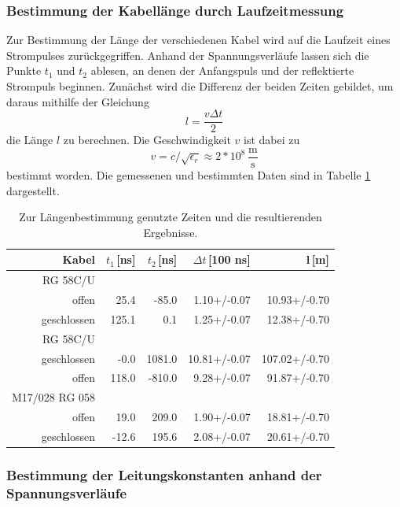 \subsubsection{Bestimmung der Kabellänge durch Laufzeitmessung} %
\label{sub:bestimmung_der_kabellaenge_durch_laufzeitmessung}

Zur Bestimmung der Länge der verschiedenen Kabel wird auf die Laufzeit eines Strompulses zurückgegriffen.
Anhand der Spannungsverläufe lassen sich die Punkte $t_1$ und $t_2$ ablesen, an denen der Anfangspuls und der reflektierte Strompuls beginnen.
Zunächst wird die Differenz der beiden Zeiten gebildet, um daraus mithilfe der Gleichung
\begin{equation}
	l = \frac{v \Delta t}{2}
\end{equation}
die Länge $l$ zu berechnen.
Die Geschwindigkeit $v$ ist dabei zu
\begin{equation}
	v = c/\sqrt{\epsilon_r} \approx 2*10^{8}\,\frac{\text{m}}{\text{s}}
\end{equation}
bestimmt worden.
Die gemessenen und bestimmten Daten sind in Tabelle \ref{tab_zeit1} dargestellt.


\begin{table}
\centering
	\caption[]{Zur Längenbestimmung genutzte Zeiten und die resultierenden Ergebnisse.}
	\begin{tabular}{r r r r r}
		Kabel & $t_1$\,[ns] & $t_2$\,[ns] & $\Delta t$\,[100 ns] & l\,[m]\\
		\hline \hline
		 RG 58C/U & & & & \\
		 offen & 	  25.4	&   -85.0	&	 1.10+/-0.07 &	 10.93+/-0.70\\
		geschlossen	& 125.1	&     0.1	&	 1.25+/-0.07 &	 12.38+/-0.70\\
		RG 58C/U & &&&\\
		geschlossen	&  -0.0	&  1081.0	&	10.81+/-0.07 &	107.02+/-0.70\\
		offen	 & 118.0	&  -810.0	&	 9.28+/-0.07 &	 91.87+/-0.70\\
		M17/028 RG 058&&&&\\
		offen 	 & 19.0	&   209.0	&	 1.90+/-0.07 &	 18.81+/-0.70\\
		geschlossen	 & -12.6	&   195.6	&	 2.08+/-0.07 &	 20.61+/-0.70\\
			\hline
	\end{tabular}
	\label{tab_zeit1}
\end{table}
\FloatBarrier
\subsubsection{Bestimmung der Leitungskonstanten anhand der Spannungsverläufe} %
\label{sub:bestimmung_der_kabellaenge_anhand_der_spannungsverlaeufe}


